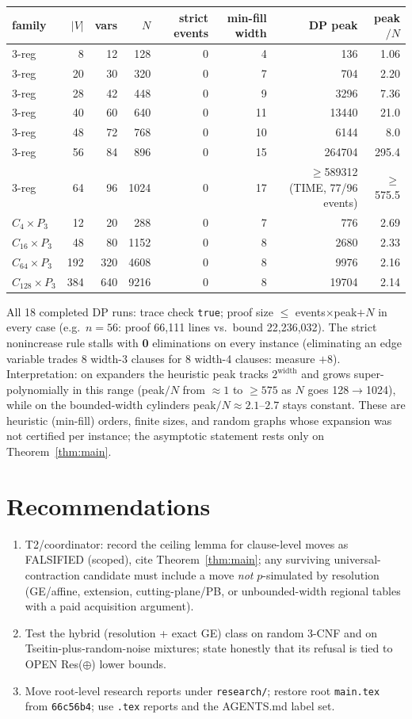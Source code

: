 \documentclass[11pt]{article}
\theoremstyle{definition}
\begin{document}
\begin{center}\small
\begin{tabular}{lrrrrrrr}
\toprule
family & $|V|$ & vars & $N$ & strict events & min-fill width & DP peak & peak$/N$\\
\midrule
3-reg & 8 & 12 & 128 & 0 & 4 & 136 & 1.06\\
3-reg & 20 & 30 & 320 & 0 & 7 & 704 & 2.20\\
3-reg & 28 & 42 & 448 & 0 & 9 & 3296 & 7.36\\
3-reg & 40 & 60 & 640 & 0 & 11 & 13440 & 21.0\\
3-reg & 48 & 72 & 768 & 0 & 10 & 6144 & 8.0\\
3-reg & 56 & 84 & 896 & 0 & 15 & 264704 & 295.4\\
3-reg & 64 & 96 & 1024 & 0 & 17 & $\ge$589312 (TIME, 77/96 events) & $\ge$575.5\\
\midrule
$C_{4}\times P_3$ & 12 & 20 & 288 & 0 & 7 & 776 & 2.69\\
$C_{16}\times P_3$ & 48 & 80 & 1152 & 0 & 8 & 2680 & 2.33\\
$C_{64}\times P_3$ & 192 & 320 & 4608 & 0 & 8 & 9976 & 2.16\\
$C_{128}\times P_3$ & 384 & 640 & 9216 & 0 & 8 & 19704 & 2.14\\
\bottomrule
\end{tabular}
\end{center}
All 18 completed DP runs: trace check \texttt{true}; proof size $\le$ events$\times$peak$+N$ in every case
(e.g.\ $n=56$: proof 66{,}111 lines vs.\ bound 22{,}236{,}032). The strict nonincrease rule stalls with
\textbf{0} eliminations on every instance (eliminating an edge variable trades 8 width-3 clauses for 8 width-4
clauses: measure $+8$). Interpretation: on expanders the heuristic peak tracks $2^{\text{width}}$ and grows
super-polynomially in this range (peak$/N$ from $\approx1$ to $\ge575$ as $N$ goes 128$\to$1024), while on the
bounded-width cylinders peak$/N\approx2.1$--$2.7$ stays constant. These are heuristic (min-fill) orders, finite sizes,
and random graphs whose expansion was not certified per instance; the asymptotic statement rests only on
Theorem~\ref{thm:main}.

\section{Recommendations}
\begin{enumerate}
\item T2/coordinator: record the ceiling lemma for clause-level moves as FALSIFIED (scoped), cite
Theorem~\ref{thm:main}; any surviving universal-contraction candidate must include a move \emph{not}
$p$-simulated by resolution (GE/affine, extension, cutting-plane/PB, or unbounded-width regional tables with a paid
acquisition argument).
\item Test the hybrid (resolution + exact GE) class on random 3-CNF and on Tseitin-plus-random-noise mixtures;
state honestly that its refusal is tied to OPEN Res($\oplus$) lower bounds.
\item Move root-level research reports under \texttt{research/}; restore root \texttt{main.tex} from
\texttt{66c56b4}; use \texttt{.tex} reports and the AGENTS.md label set.
\end{enumerate}
\end{document}
